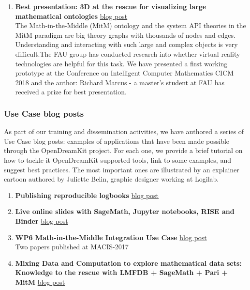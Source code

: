 \begin{enumerate}
\item \textbf{Best presentation: 3D at the rescue for visualizing large mathematical ontologies}
  \href{https://opendreamkit.org/2018/08/20/tgview3d.md}{blog post}\\
  The Math-in-the-Middle (MitM) ontology and the system API theories
  in the MitM paradigm are big theory graphs with thousands of nodes
  and edges. Understanding and interacting with such large and complex
  objects is very difficult.The FAU group has conducted research into
  whether virtual reality technologies are helpful for this task. We
  have presented a first working prototype at the Conference on
  Intelligent Computer Mathematics CICM 2018 and the author: Richard
  Marcus - a master's student at FAU has received a prize for best
  presentation.
\end{enumerate}


\subsubsection{Use Case blog posts}

As part of our training and dissemination activities, we have authored
a series of Use Case blog posts: examples of applications that have
been made possible through the OpenDreamKit project. For each one, we
provide a brief tutorial on how to tackle it OpenDreamKit supported
tools, link to some examples, and suggest best practices. The most
important ones are illustrated by an explainer cartoon authored by
Juliette Belin, graphic designer working at Logilab.

\begin{enumerate}
\item \textbf{Publishing reproducible logbooks}
  \href{https://opendreamkit.org/2017/11/02/use-case-publishing-reproducible-notebooks}{blog post}
\item \textbf{Live online slides with SageMath, Jupyter notebooks, RISE and Binder}
  \href{https://opendreamkit.org/2018/07/23/live-online-slides-with-sagemath-jupyter-rise-binder/}{blog post}
\item \textbf{WP6 Math-in-the-Middle Integration Use Case}
  \href{https://opendreamkit.org/2017/10/15/WP6-Usecase/}{blog post}\\
  Two papers published at MACIS-2017
\item \textbf{Mixing Data and Computation to explore mathematical data sets: Knowledge to the rescue with LMFDB + SageMath + Pari + MitM}
  \href{https://opendreamkit.org/2018/05/16/lmfdb-usecase/}{blog post}
\end{enumerate}

